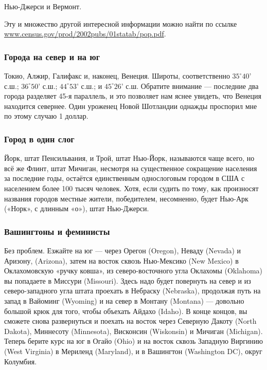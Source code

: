 Нью-Джерси и Вермонт.

Эту и множество другой интересной информации можно найти по ссылке
\href{http//www.census.gov/prod/2002pubs/01statab/pop.pdf}{\url{www.census.gov/prod/2002pubs/01statab/pop.pdf}}.
 \heart                          

\subsubsection*{Города на север и на юг}%

Токио, Алжир, Галифакс и, наконец, Венеция.
Широты, соответственно
$35^\circ 40’$ с.ш.; $36^\circ 50’$ с.ш.; $44^\circ 53’$ с.ш.; и $45^\circ 26’$ с.ш.
Обратите внимание --- последние два города разделяет 45-я параллель, и это позволяет нам яснее увидеть, что Венеция находится севернее.
Один уроженец Новой Шотландии однажды проспорил мне по этому случаю 1 доллар.
\heart

\subsubsection*{Город в один слог}%

Йорк, штат Пенсильвания, и Трой, штат Нью-Йорк, называются чаще всего, но всё же Флинт, штат Мичиган, несмотря на существенное сокращение населения за последние годы, остаётся единственным однослоговым городом в США с населением более 100 тысяч человек.
Хотя, если судить по тому, как произносят названия городов местные жители, победителем, несомненно, будет Нью-Арк («Норк», с длинным «о»), штат Нью-Джерси.
\heart

\subsubsection*{Вашингтоны и феминисты} %

{\sloppy 

Без проблем.
Езжайте на юг --- через Орегон (Oregon), 
Неваду (Nevada) 
и Аризону, (Arizona), 
затем на восток сквозь Нью-Мексико (New Mexico) 
в Оклахомовскую «ручку ковша», из северо-восточного угла Оклахомы (Oklahoma) 
вы попадаете в Миссури (Mis\-sou\-ri).
Здесь надо будет повернуть на север и из северо-западного угла штата проехать в Небраску (Nebraska), продолжая путь на запад в Вайоминг (Wyoming) и на север в Монтану (Montana) --- довольно большой крюк для того, чтобы объехать Айдахо (Idaho).
В конце концов, вы сможете снова развернуться и поехать на восток через Северную Дакоту (North Dakota), 
Миннесоту (Minnesota), 
Висконсин (Wiskonsin) 
и Мичиган (Michigan).
Теперь берите курс на юг в Огайо (Ohio) и на восток сквозь Западную Виргинию (West Virginia) в Мериленд (Maryland),
 и в Вашингтон (Washington DC), округ Колумбия.\heart
 
}

